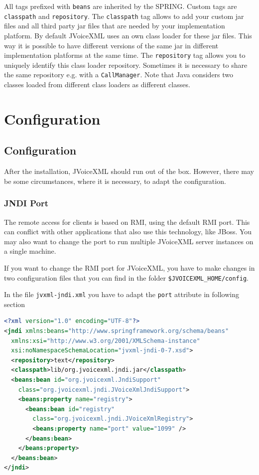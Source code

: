 \documentclass[11pt,a4paper]{book}
\begin{document}
All tags prefixed with \lstinline{beans} are inherited by the SPRING. Custom
tags are \lstinline{classpath} and \lstinline{repository}. The
\lstinline{classpath} tag allows to add your custom jar files and all third
party jar files that are needed by your implementation platform. By default
JVoiceXML uses an own class loader for these jar files. This way it is possible
to have different versions of the same jar in different implementation
platforms at the same time. The \lstinline{repository} tag allows you to
uniquely identify this class loader repository. Sometimes it is necessary to
share the same repository e.g. with a \lstinline[language=Java]{CallManager}.
Note that Java considers two classes loaded from different class loaders as
different classes.

\chapter{Configuration}

\section{Configuration}
\label{sec:configuration}

After the installation, JVoiceXML should run out of the box. However, there may 
be some circumstances, where it is necessary, to adapt the configuration.

\subsection{JNDI Port}
\label{sec:jndi-port}

The remote access for clients is based on RMI, using the default RMI port. This
can conflict with other applications that also use this technology, like JBoss.
You may also want to change the port to run multiple JVoiceXML server instances
on a single machine.

If you want to change the RMI port for JVoiceXML, you have to make changes in 
two configuration files that you can find in the folder 
\texttt{\$JVOICEXML\_HOME/config}.

In the file \texttt{jvxml-jndi.xml} you have to adapt the \texttt{port} 
attribute in following section

\begin{lstlisting}[language=XML]
<?xml version="1.0" encoding="UTF-8"?>
<jndi xmlns:beans="http://www.springframework.org/schema/beans"
  xmlns:xsi="http://www.w3.org/2001/XMLSchema-instance"
  xsi:noNamespaceSchemaLocation="jvxml-jndi-0-7.xsd">
  <repository>text</repository>
  <classpath>lib/org.jvoicexml.jndi.jar</classpath>
  <beans:bean id="org.jvoicexml.JndiSupport"
    class="org.jvoicexml.jndi.JVoiceXmlJndiSupport">
    <beans:property name="registry">
      <beans:bean id="registry"
        class="org.jvoicexml.jndi.JVoiceXmlRegistry">
        <beans:property name="port" value="1099" />
      </beans:bean>
    </beans:property>
  </beans:bean>
</jndi>
\end{lstlisting}
\end{document}
